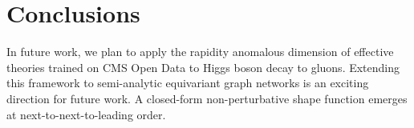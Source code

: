 \section{Conclusions}\label{sec:conclusions}

In future work, we plan to apply the rapidity anomalous dimension of
effective theories trained on CMS Open Data to Higgs boson decay to
gluons. Extending this framework to semi-analytic equivariant graph
networks is an exciting direction for future work. A closed-form
non-perturbative shape function emerges at next-to-next-to-leading
order.

